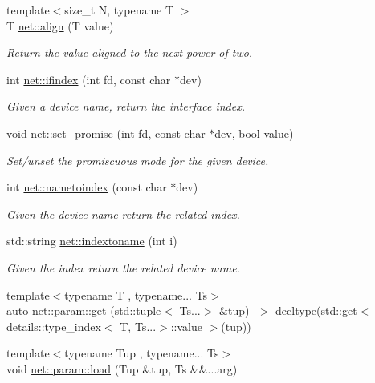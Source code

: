 \begin{DoxyCompactItemize}
\item 
{\footnotesize template$<$size\-\_\-t N, typename T $>$ }\\T \hyperlink{namespacenet_ac59f25900e63bf19f99bbcb44824b134}{net\-::align} (T value)
\begin{DoxyCompactList}\small\item\em Return the value aligned to the next power of two. \end{DoxyCompactList}\item 
int \hyperlink{namespacenet_a01d1d9ebab237e4740263e2deba1ab1d}{net\-::ifindex} (int fd, const char $\ast$dev)
\begin{DoxyCompactList}\small\item\em Given a device name, return the interface index. \end{DoxyCompactList}\item 
void \hyperlink{namespacenet_a69de0e47b041dff359c54fe92eb8830a}{net\-::set\-\_\-promisc} (int fd, const char $\ast$dev, bool value)
\begin{DoxyCompactList}\small\item\em Set/unset the promiscuous mode for the given device. \end{DoxyCompactList}\item 
int \hyperlink{namespacenet_aa90cbca6e910724bc46d5f4c2b12cddf}{net\-::nametoindex} (const char $\ast$dev)
\begin{DoxyCompactList}\small\item\em Given the device name return the related index. \end{DoxyCompactList}\item 
std\-::string \hyperlink{namespacenet_ac7628d7e4c8e89d8ada4d75c292f575f}{net\-::indextoname} (int i)
\begin{DoxyCompactList}\small\item\em Given the index return the related device name. \end{DoxyCompactList}\item 
{\footnotesize template$<$typename T , typename... Ts$>$ }\\auto \hyperlink{namespacenet_1_1param_a9020a1d5f00da972acbea3e809d3c602}{net\-::param\-::get} (std\-::tuple$<$ Ts...$>$ \&tup) -\/$>$ decltype(std\-::get$<$ details\-::type\-\_\-index$<$ T, Ts...$>$\-::value $>$(tup))
\item 
{\footnotesize template$<$typename Tup , typename... Ts$>$ }\\void \hyperlink{namespacenet_1_1param_aef5f360e345f5ab876c171a76a0777a2}{net\-::param\-::load} (Tup \&tup, Ts \&\&...arg)
\end{DoxyCompactItemize}
